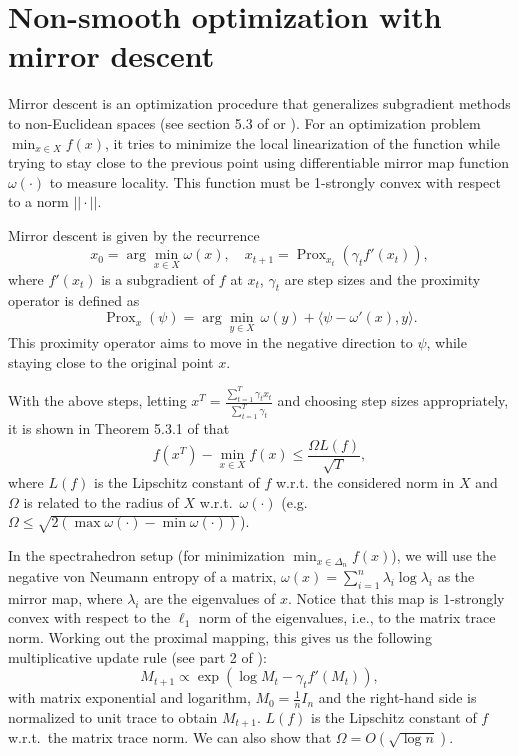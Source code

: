 \documentclass{article}
\DeclareMathOperator{\Prox}{Prox}
\begin{document}
\section{Non-smooth optimization with mirror descent}

Mirror descent is an optimization procedure that generalizes subgradient methods to non-Euclidean spaces (see section 5.3 of \cite{lectures} or \cite{blog}). For an optimization problem $\min_{x \in X} f(x)$, it tries to minimize the local linearization of the function while trying to stay close to the previous point using  differentiable mirror map function $\omega(\cdot)$ to measure locality. This function must be 1-strongly convex with respect to a norm $||\cdot||$.

Mirror descent is given by the recurrence
\[ x_0 = \arg\min_{x \in X} \omega(x), \quad x_{t+1} = \Prox_{x_t}(\gamma_t f'(x_t)), \]
where $f'(x_t)$ is a subgradient of $f$ at $x_t$, $\gamma_t$ are step sizes and the proximity operator is defined as
\[ \Prox_{x}(\psi ) = \arg\min_{y \in X} \, \omega(y) + \langle \psi - \omega'(x), y \rangle. \]
This proximity operator aims to move in the negative direction to $\psi$, while staying close to the original point $x$.

With the above steps, letting $x^T = \frac{\sum_{t=1}^T \gamma_t x_t}{\sum_{t=1}^T \gamma_t}$ and choosing step sizes appropriately, it is shown in Theorem 5.3.1 of \cite{lectures} that
\[ f(x^T) - \min_{x \in X} f(x) \leq \frac{\Omega L(f)}{\sqrt{T}}, \]
where $L(f)$ is the Lipschitz constant of $f$ w.r.t. the considered norm in $X$ and $\Omega$ is related to the radius of $X$ w.r.t.\ $\omega(\cdot)$ (e.g.\ $\Omega \leq \sqrt{2 (\max \omega(\cdot) - \min \omega(\cdot))}$).


In the spectrahedron setup (for minimization $\min_{x \in \Delta_n} f(x)$), we will use the negative von Neumann entropy of a matrix, $\omega(x) = \sum_{i=1}^n \lambda_i \log \lambda_i$ as the mirror map, where $\lambda_i$ are the eigenvalues of $x$. Notice that this map is $1$-strongly convex with respect to the $\ell_1$ norm of the eigenvalues, i.e., to the matrix trace norm. Working out the proximal mapping, this gives us the following multiplicative update rule (see part 2 of \cite{blog}):
\begin{equation}\label{eq:expUpdate}
  M_{t+1} \propto \exp \left( \log M_t - \gamma_t f'(M_t) \right),
\end{equation}
with matrix exponential and logarithm, $M_0 = \frac{1}{n} I_n$ and the right-hand side is normalized to unit trace to obtain $M_{t+1}$. $L(f)$ is the Lipschitz constant of $f$ w.r.t.\ the matrix trace norm. We can also show that $\Omega = O(\sqrt{\log n})$.
\end{document}
